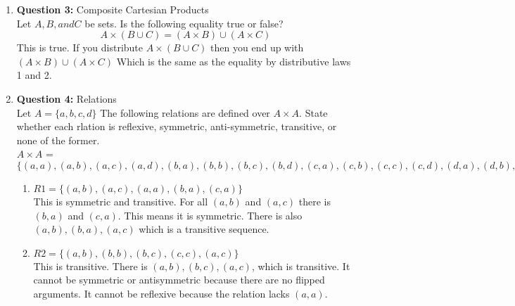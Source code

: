 \documentclass[11pt]{article}
\begin{document}
\begin{enumerate}
\begin{enumerate}[label=(\alph*)]
    \item 
    $C \times A$ = $\{(True, 1), (True, 2), (True, 3), (True, 4), (False, 1), (False, 2), (False, 3), (False, 4)\} $
    \item 
    $B \times B$ = $\{(a,a),(a,b),(a,c),(b,a),(b,b),(b,c),(c,a),(c,b),(c,c)\}$
    \item 
    $B \times A \times C$ = $\{(a,1,True), (a,2, True), (a, 3, True), (a, 4, True), (a, 1, False), (a, 2, False), (a, 3, False), \\ (a, 4, False), (b,1,True), (b,2, True), (b, 3, True), (b, 4, True), (b, 1, False), (b, 2, False), (b, 3, False), \\ (b, 4, False), (c,1,True), (c,2, True), (c, 3, True), (c, 4, True), (c, 1, False), (c, 2, False), (c, 3, False), \\ (c, 4, False)\}$
\end{enumerate}
\item
\textbf{Question 3:} Composite Cartesian Products \\
Let $A, B, and C$ be sets. Is the following equality true or false?
\begin{equation*}
    A \times (B \cup C) = (A \times B) \cup (A \times C)
\end{equation*}
This is true. If you distribute $A \times (B \cup C)$ then you end up with $(A \times B) \cup (A \times C)$ Which is the same as the equality by distributive laws 1 and 2. 
\item
\textbf{Question 4:} Relations \\
Let $A = \{a,b,c,d\}$ The following relations are defined over $A \times A$. State whether each rlation is reflexive, symmetric, anti-symmetric, transitive, or none of the former. \\
$A \times A$ = $\{(a,a),(a,b),(a,c),(a,d),(b,a),(b,b),(b,c),(b,d),(c,a),(c,b),(c,c),(c,d),(d,a),(d,b),(d,c),(d,d)\}$
\begin{enumerate}[label=(\alph*)]
    \item 
    $R1 = \{(a,b),(a,c),(a,a),(b,a),(c,a)\}$\\
    This is symmetric and transitive. For all $(a,b)$ and $(a,c)$ there is $(b,a)$ and $(c,a)$. This means it is symmetric. There is also $(a,b), (b,a),(a,c)$ which is a transitive sequence.
    \item 
    $R2 = \{(a,b),(b,b),(b,c),(c,c),(a,c)\}$ \\
    This is transitive. There is $(a,b),(b,c),(a,c)$, which is transitive. It cannot be symmetric or antisymmetric because there are no flipped arguments. It cannot be reflexive because the relation lacks $(a,a)$.

\end{enumerate}
\end{enumerate}
\end{document}
